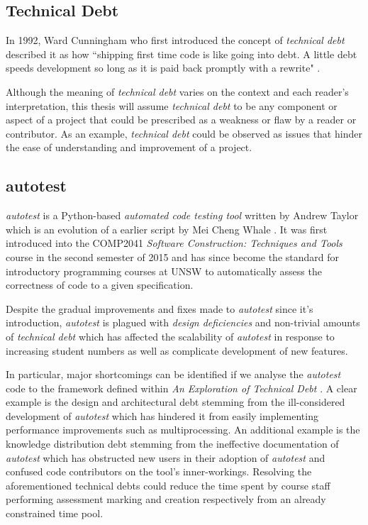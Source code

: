 \documentclass[hidelinks, 12pt]{extreport}
\begin{document}
\subsection{Technical Debt}
In 1992, Ward Cunningham who first introduced the concept of \textit{technical debt} described it as how ``shipping first time code is like going into debt. A little debt speeds development so long as it is paid back promptly with a rewrite" \cite{TechnicalDebtConcept}.

Although the meaning of \textit{technical debt} varies on the context and each reader's interpretation, this thesis will assume \textit{technical debt} to be any component or aspect of a project that could be prescribed as a weakness or flaw by a reader or contributor. As an example, \textit{technical debt} could be observed as issues that hinder the ease of understanding and improvement of a project. 

\subsection{autotest}
\textit{autotest} is a Python-based \textit{automated code testing tool} written by Andrew Taylor which is an evolution of a earlier script by Mei Cheng Whale \cite{Autotest}. It was first introduced into the COMP2041 \textit{Software Construction: Techniques and Tools} course in the second semester of 2015 and has since become the standard for introductory programming courses at UNSW to automatically assess the correctness of code to a given specification.

Despite the gradual improvements and fixes made to \textit{autotest} since it's introduction, \textit{autotest} is plagued with \textit{design deficiencies} and non-trivial amounts of \textit{technical debt} which has affected the scalability of \textit{autotest} in response to increasing student numbers as well as complicate development of new features.

In particular, major shortcomings can be identified if we analyse the \textit{autotest} code to the framework defined within \textit{An Exploration of Technical Debt} \cite{TechnicalDebt}. A clear example is the design and architectural debt stemming from the ill-considered development of \textit{autotest} which has hindered it from easily implementing performance improvements such as multiprocessing. An additional example is the knowledge distribution debt stemming from the ineffective documentation of \textit{autotest} which has obstructed new users in their adoption of \textit{autotest} and confused code contributors on the tool's inner-workings. Resolving the aforementioned technical debts could reduce the time spent by course staff performing assessment marking and creation respectively from an already constrained time pool.
\end{document}
